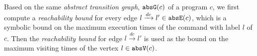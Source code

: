 Based on the same \emph{abstract transition graph}, $\mathtt{abs}{\mathtt{G}}(c)$ of a program $c$, we first compute a \emph{reachability bound} for every edge $l \xrightarrow{dc} l' \in \mathtt{abs}{\mathtt{E}}(c)$,
which is a symbolic bound on the maximum execution times of the command with label $l$ of $c$.
Then the \emph{reachability bound} for edge $l \xrightarrow{dc} l'$ is used as the bound on the maximum visiting times of the vertex $l \in \mathtt{abs}{\mathtt{V}}(c)$.


